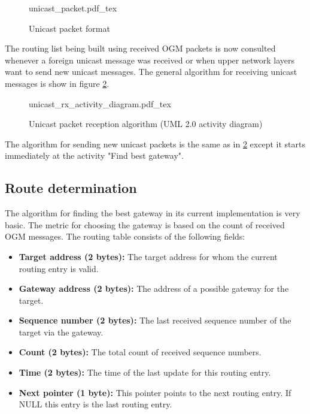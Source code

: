 \begin{figure}[H]
    \centering
    {unicast_packet.pdf_tex}
    \caption{Unicast packet format}
    \label{fig:unicast_packet}
\end{figure}

The routing list being built using received OGM packets is now consulted whenever a foreign unicast message was received or when upper network layers want to send new unicast messages. The general algorithm for receiving unicast messages is show in figure \ref{fig:unicast_alg}.

\begin{figure}[H]
    \centering
    \sffamily
    {unicast_rx_activity_diagram.pdf_tex}
    \rmfamily
    \caption{Unicast packet reception algorithm (UML 2.0 activity diagram)}
    \label{fig:unicast_alg}
\end{figure}

The algorithm for sending new unicast packets is the same as in \ref{fig:unicast_alg} except it starts immediately at the activity "Find best gateway".

\subsection{Route determination}%
\label{sec:route}
The algorithm for finding the best gateway in its current implementation is very basic. The metric for choosing the gateway is based on the count of received OGM messages. The routing table consists of the following fields:

\begin{itemize}
    \item \textbf{Target address (2 bytes):} The target address for whom the current routing entry is valid.
    \item \textbf{Gateway address (2 bytes):} The address of a possible gateway for the target.
    \item \textbf{Sequence number (2 bytes):} The last received sequence number of the target via the gateway.
    \item \textbf{Count (2 bytes):} The total count of received sequence numbers.
    \item \textbf{Time (2 bytes):} The time of the last update for this routing entry.
    \item \textbf{Next pointer (1 byte):} This pointer points to the next routing entry. If NULL this entry is the last routing entry.
\end{itemize}

